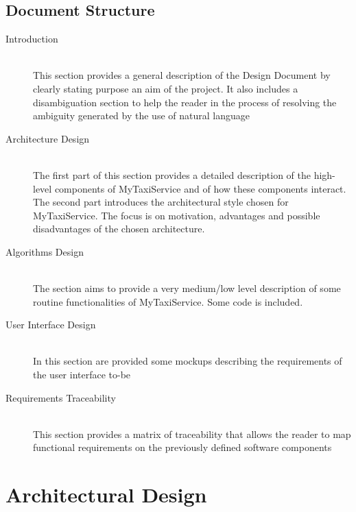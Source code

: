 \documentclass[11pt,titlepage]{article} %
\begin{document}
\subsection{Document Structure}
	\begin{description}
	     \item [Introduction] \hfill \\
	      This section provides a general description of the Design Document by clearly stating purpose an aim of the project.
	      It also includes a disambiguation section to help the reader in the process of resolving the ambiguity generated by
	      the use of natural language
	
	     \item [Architecture Design] \hfill \\
	      The first part of this section provides a detailed description of the high-level components of MyTaxiService and of how
	      these components interact.
	      The second part introduces the architectural style chosen for MyTaxiService. The focus is on motivation, advantages and possible
	      disadvantages of the chosen architecture.
	
	    \item [Algorithms Design] \hfill \\
	      The section aims to provide a very medium/low level description of some routine functionalities of MyTaxiService.
	      Some code is included.
	
	    \item [User Interface Design] \hfill \\
	      In this section are provided some mockups describing the requirements of the user interface to-be
	
	    \item [Requirements Traceability] \hfill \\
	      This section provides a matrix of traceability that allows the reader to map functional requirements on the
	      previously defined software components
	\end{description}

\newpage

\section{Architectural Design}
\end{document}
